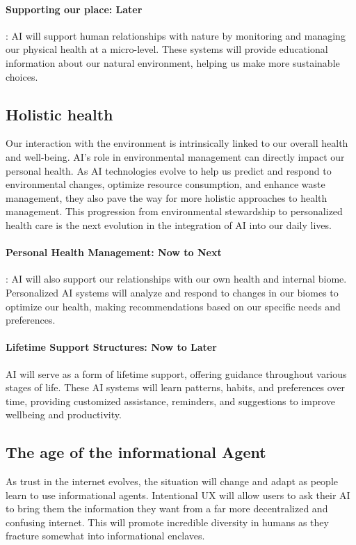 \paragraph{Supporting our place: Later}: 
AI will support human relationships with nature by monitoring and managing our physical health at a micro-level. These systems will provide educational information about our natural environment, helping us make more sustainable choices.
\subsection{Holistic health}
Our interaction with the environment is intrinsically linked to our overall health and well-being. AI’s role in environmental management can directly impact our personal health. As AI technologies evolve to help us predict and respond to environmental changes, optimize resource consumption, and enhance waste management, they also pave the way for more holistic approaches to health management. This progression from environmental stewardship to personalized health care is the next evolution in the integration of AI into our daily lives.
\paragraph{Personal Health Management: Now to Next}: 
AI will also support our relationships with our own health and internal biome. Personalized AI systems will analyze and respond to changes in our biomes to optimize our health, making recommendations based on our specific needs and preferences.
\paragraph{Lifetime Support Structures: Now to Later}
AI will serve as a form of lifetime support, offering guidance throughout various stages of life. These AI systems will learn patterns, habits, and preferences over time, providing customized assistance, reminders, and suggestions to improve wellbeing and productivity.
\subsection{The age of the informational Agent}
As trust in the internet evolves, the situation will change and adapt as people learn to use informational agents. Intentional UX will allow users to ask their AI to bring them the information they want from a far more decentralized and confusing internet. This will promote incredible diversity in humans as they fracture somewhat into informational enclaves.

